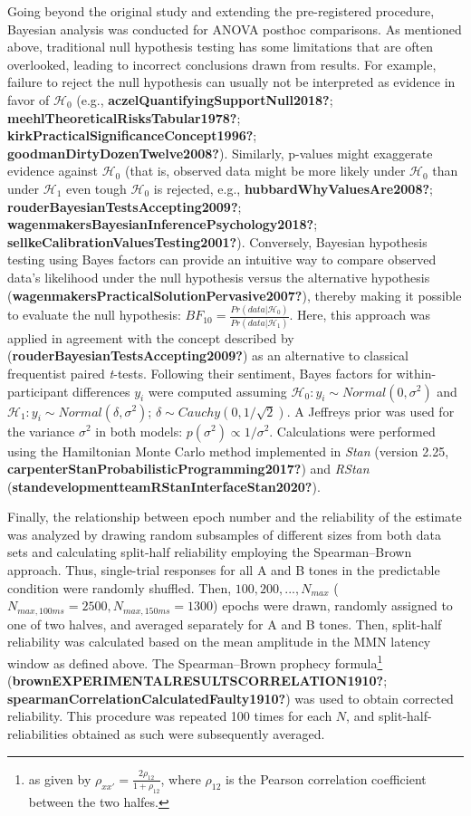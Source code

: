 \documentclass[twoside, man, a4paper,12pt, nofontenc]{apa7}
\begin{document}
Going beyond the original study and extending the pre-registered
procedure, Bayesian analysis was conducted for ANOVA posthoc
comparisons. As mentioned above, traditional null hypothesis testing has
some limitations that are often overlooked, leading to incorrect
conclusions drawn from results. For example, failure to reject the null
hypothesis can usually not be interpreted as evidence in favor of
\(\mathcal{H_0}\) (e.g., \textbf{aczelQuantifyingSupportNull2018?};
\textbf{meehlTheoreticalRisksTabular1978?};
\textbf{kirkPracticalSignificanceConcept1996?};
\textbf{goodmanDirtyDozenTwelve2008?}). Similarly, p-values might
exaggerate evidence against \(\mathcal{H_0}\) (that is, observed data
might be more likely under \(\mathcal{H_0}\) than under
\(\mathcal{H_1}\) even tough \(\mathcal{H_0}\) is rejected, e.g.,
\textbf{hubbardWhyValuesAre2008?};
\textbf{rouderBayesianTestsAccepting2009?};
\textbf{wagenmakersBayesianInferencePsychology2018?};
\textbf{sellkeCalibrationValuesTesting2001?}). Conversely, Bayesian
hypothesis testing using Bayes factors can provide an intuitive way to
compare observed data's likelihood under the null hypothesis versus the
alternative hypothesis
(\textbf{wagenmakersPracticalSolutionPervasive2007?}), thereby making it
possible to evaluate the null hypothesis:
\(BF_{10} = \frac{Pr(data|\mathcal{H}_0)}{Pr(data|\mathcal{H}_1)}\).
Here, this approach was applied in agreement with the concept described
by (\textbf{rouderBayesianTestsAccepting2009?}) as an alternative to
classical frequentist paired \emph{t}-tests. Following their sentiment,
Bayes factors for within-participant differences \(y_i\) were computed
assuming \(\mathcal{H_0}: y_i \sim Normal(0, \sigma^2)\) and
\(\mathcal{H_1}: y_i \sim Normal(\delta, \sigma^2)\);
\(\delta \sim Cauchy(0, 1/\sqrt{2})\). A Jeffreys prior was used for the
variance \(\sigma^2\) in both models:
\(p(\sigma^2) \propto 1/\sigma^2\). Calculations were performed using
the Hamiltonian Monte Carlo method implemented in \emph{Stan} (version
2.25, \textbf{carpenterStanProbabilisticProgramming2017?}) and
\emph{RStan} (\textbf{standevelopmentteamRStanInterfaceStan2020?}).

Finally, the relationship between epoch number and the reliability of
the estimate was analyzed by drawing random subsamples of different
sizes from both data sets and calculating split-half reliability
employing the Spearman--Brown approach. Thus, single-trial responses for
all A and B tones in the predictable condition were randomly shuffled.
Then, \(100, 200, ..., N_{max}\)
(\(N_{max, 100ms} = 2500, N_{max, 150ms}=1300\)) epochs were drawn,
randomly assigned to one of two halves, and averaged separately for A
and B tones. Then, split-half reliability was calculated based on the
mean amplitude in the MMN latency window as defined above. The
Spearman--Brown prophecy formula\footnote{as given by
  \({\rho}_{xx'} = \frac{2{\rho}_{12}}{1+{\rho}_{12}}\), where
  \({\rho_{12}}\) is the Pearson correlation coefficient between the two
  halfes.} (\textbf{brownEXPERIMENTALRESULTSCORRELATION1910?};
\textbf{spearmanCorrelationCalculatedFaulty1910?}) was used to obtain
corrected reliability. This procedure was repeated 100 times for each
\(N\), and split-half-reliabilities obtained as such were subsequently
averaged.
\end{document}
